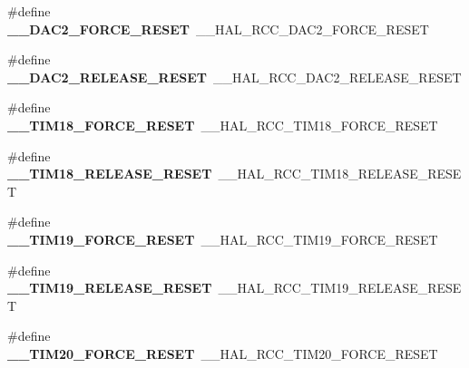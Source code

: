 \begin{DoxyCompactItemize}
\item 
\mbox{\label{group___h_a_l___r_c_c___aliased_gaf8cc5ae83a56884ca8e347a876f425b3}} 
\#define {\bfseries \+\_\+\+\_\+\+D\+A\+C2\+\_\+\+F\+O\+R\+C\+E\+\_\+\+R\+E\+S\+ET}~\+\_\+\+\_\+\+H\+A\+L\+\_\+\+R\+C\+C\+\_\+\+D\+A\+C2\+\_\+\+F\+O\+R\+C\+E\+\_\+\+R\+E\+S\+ET
\item 
\mbox{\label{group___h_a_l___r_c_c___aliased_ga2ca6c2de66e0242e9941d090e8e99ecd}} 
\#define {\bfseries \+\_\+\+\_\+\+D\+A\+C2\+\_\+\+R\+E\+L\+E\+A\+S\+E\+\_\+\+R\+E\+S\+ET}~\+\_\+\+\_\+\+H\+A\+L\+\_\+\+R\+C\+C\+\_\+\+D\+A\+C2\+\_\+\+R\+E\+L\+E\+A\+S\+E\+\_\+\+R\+E\+S\+ET
\item 
\mbox{\label{group___h_a_l___r_c_c___aliased_ga6b03e584a99a7145ffd9953327722870}} 
\#define {\bfseries \+\_\+\+\_\+\+T\+I\+M18\+\_\+\+F\+O\+R\+C\+E\+\_\+\+R\+E\+S\+ET}~\+\_\+\+\_\+\+H\+A\+L\+\_\+\+R\+C\+C\+\_\+\+T\+I\+M18\+\_\+\+F\+O\+R\+C\+E\+\_\+\+R\+E\+S\+ET
\item 
\mbox{\label{group___h_a_l___r_c_c___aliased_ga062debe81b59ed9a88bcf4258e09dbaf}} 
\#define {\bfseries \+\_\+\+\_\+\+T\+I\+M18\+\_\+\+R\+E\+L\+E\+A\+S\+E\+\_\+\+R\+E\+S\+ET}~\+\_\+\+\_\+\+H\+A\+L\+\_\+\+R\+C\+C\+\_\+\+T\+I\+M18\+\_\+\+R\+E\+L\+E\+A\+S\+E\+\_\+\+R\+E\+S\+ET
\item 
\mbox{\label{group___h_a_l___r_c_c___aliased_ga9e4eca7dac56bd682758cf5072f4e063}} 
\#define {\bfseries \+\_\+\+\_\+\+T\+I\+M19\+\_\+\+F\+O\+R\+C\+E\+\_\+\+R\+E\+S\+ET}~\+\_\+\+\_\+\+H\+A\+L\+\_\+\+R\+C\+C\+\_\+\+T\+I\+M19\+\_\+\+F\+O\+R\+C\+E\+\_\+\+R\+E\+S\+ET
\item 
\mbox{\label{group___h_a_l___r_c_c___aliased_ga16341f8a1420c4029215b0c89de8bda5}} 
\#define {\bfseries \+\_\+\+\_\+\+T\+I\+M19\+\_\+\+R\+E\+L\+E\+A\+S\+E\+\_\+\+R\+E\+S\+ET}~\+\_\+\+\_\+\+H\+A\+L\+\_\+\+R\+C\+C\+\_\+\+T\+I\+M19\+\_\+\+R\+E\+L\+E\+A\+S\+E\+\_\+\+R\+E\+S\+ET
\item 
\mbox{\label{group___h_a_l___r_c_c___aliased_gab06074cd313cdabefa42d60b6480abc1}} 
\#define {\bfseries \+\_\+\+\_\+\+T\+I\+M20\+\_\+\+F\+O\+R\+C\+E\+\_\+\+R\+E\+S\+ET}~\+\_\+\+\_\+\+H\+A\+L\+\_\+\+R\+C\+C\+\_\+\+T\+I\+M20\+\_\+\+F\+O\+R\+C\+E\+\_\+\+R\+E\+S\+ET

\end{DoxyCompactItemize}
